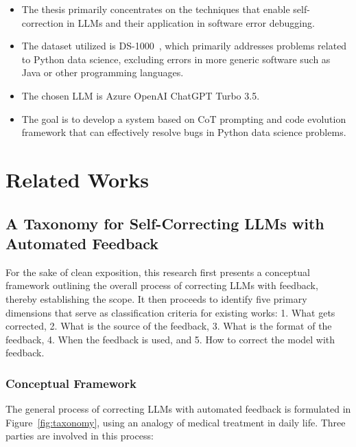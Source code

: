 \documentclass[a4paper,oneside]{book}
\begin{document}
\begin{itemize}
    \item The thesis primarily concentrates on the techniques that enable self-correction in LLMs and their application in software error debugging.

    \item The dataset utilized is DS-1000~\cite{pmlr-v202-lai23b}, which primarily addresses problems related to Python data science, excluding errors in more generic software such as Java or other programming languages.

    \item The chosen LLM is Azure OpenAI ChatGPT Turbo 3.5.

    \item The goal is to develop a system based on CoT prompting and code evolution framework that can effectively resolve bugs in Python data science problems.
\end{itemize}

\chapter{Related Works}

\section{A Taxonomy for Self-Correcting LLMs with Automated Feedback}
For the sake of clean exposition, this research first presents a conceptual framework outlining the overall process of correcting LLMs with feedback, thereby establishing the scope. It then proceeds to identify five primary dimensions that serve as classification criteria for existing works: 1. What gets corrected, 2. What is the source of the feedback, 3. What is the format of the feedback, 4. When the feedback is used, and 5. How to correct the model with feedback.

\subsection{Conceptual Framework}
The general process of correcting LLMs with automated feedback is formulated in Figure~\ref{fig:taxonomy}, using an analogy of medical treatment in daily life. Three parties are involved in this process:
\end{document}
